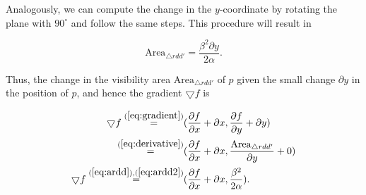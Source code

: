 Analogously, we can compute the change in the $y$-coordinate by rotating the plane with $90^\circ$ and follow the same steps. This procedure will result in

\begin{equation}
    \text{Area}_{\triangle rdd'} = \frac{\beta^2 \partial y}{2\alpha}. \label{eq:ardd2}
\end{equation}

Thus, the change in the visibility area $\text{Area}_{\triangle rdd'}$ of $p$ given the small change $\partial y$ in the position of $p$, and hence the gradient $\bigtriangledown f$ is 

\begin{align*}
    \bigtriangledown f \overset{(\ref{eq:gradient})}{=} &(\frac{\partial f}{\partial x} + \partial x, \frac{\partial f}{\partial y} + \partial y) \\
    \overset{(\ref{eq:derivative})}{=} &(\frac{\partial f}{\partial x} + \partial x, \frac{\text{Area}_{\triangle rdd'}}{\partial y} + 0) \\
    \bigtriangledown f \overset{(\ref{eq:ardd}), (\ref{eq:ardd2})}{=} &(\frac{\partial f}{\partial x} + \partial x, \frac{\beta^2}{2\alpha}). \\
\end{align*}


    

    

